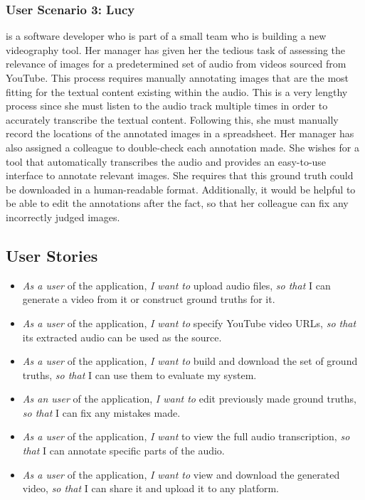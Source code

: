 \documentclass{l4proj}
\begin{document}
\subsubsection{User Scenario 3: Lucy} is a software developer who is part of a small team who is building a new videography tool. Her manager has given her the tedious task of assessing the relevance of images for a predetermined set of audio from videos sourced from YouTube. This process requires manually annotating images that are the most fitting for the textual content existing within the audio. This is a very lengthy process since she must listen to the audio track multiple times in order to accurately transcribe the textual content. Following this, she must manually record the locations of the annotated images in a spreadsheet. Her manager has also assigned a colleague to double-check each annotation made. She wishes for a tool that automatically transcribes the audio and provides an easy-to-use interface to annotate relevant images. She requires that this ground truth could be downloaded in a human-readable format. Additionally, it would be helpful to be able to edit the annotations after the fact, so that her colleague can fix any incorrectly judged images.


\subsection{User Stories}
\begin{itemize}
    \item \emph{As a user} of the application, \emph{I want to} upload audio files, \emph{so that} I can generate a video from it or construct ground truths for it.
    \item \emph{As a user} of the application, \emph{I want to} specify YouTube video URLs, \emph{so that} its extracted audio can be used as the source.
    \item \emph{As a user} of the application, \emph{I want to} build and download the set of ground truths, \emph{so that} I can use them to evaluate my system.
    \item \emph{As an user} of the application, \emph{I want to} edit previously made ground truths, \emph{so that} I can fix any mistakes made.
    \item \emph{As a user} of the application, \emph{I want} to view the full audio transcription, \emph{so that} I can annotate specific parts of the audio.
    \item \emph{As a user} of the application, \emph{I want to} view and download the generated video, \emph{so that} I can share it and upload it to any platform.
\end{itemize}
\end{document}
